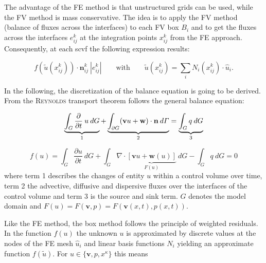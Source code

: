 The advantage of the FE method is that unstructured grids can be used, while the FV method is mass conservative. The idea is to apply the FV method (balance of fluxes across the interfaces) to each FV box $B_i$  and to get the fluxes across the interfaces $e^k_{ij}$ at the integration points $x^k_{ij}$ from the FE approach. Consequently, at each scvf the following expression results:

\begin{equation}
 	f(\tilde u(x^k_{ij})) \cdot \mathbf n^k_{ij} \: |e^k_{ij}| \qquad \textrm{with} \qquad \tilde u(x^k_{ij}) = \sum_i N_i(x^k_{ij}) \cdot \hat u_i .
\end{equation}

In the following, the discretization of the balance equation is going to be derived. From the \textsc{Reynolds} transport theorem follows the general balance equation:

\begin{equation}
	\underbrace{\int_G \frac{\partial}{\partial t} \: u \: dG}_{1} + \underbrace{\int_{\partial G} (\mathbf{v} u + \mathbf w) \cdot \textbf n \: d\varGamma}_{2} = \underbrace{\int_G q \: dG}_{3}
\end{equation}

\begin{equation}
	f(u) = \int_G \frac{\partial u}{\partial t} \: dG + \int_{G} \nabla \cdot \underbrace{\left[  \mathbf{v} u + \mathbf w(u)\right] }_{F(u)}  \: dG - \int_G q \: dG = 0
\end{equation}
where term 1 describes the changes of entity $u$ within a control volume over time, term 2 the advective, diffusive and dispersive fluxes over the interfaces of the control volume and term 3 is the source and sink term. $G$ denotes the model domain and $F(u) = F(\mathbf v, p) = F(\mathbf v(x,t), p(x,t))$.

Like the FE method, the box method follows the principle of weighted residuals. In the function $f(u)$ the unknown $u$ is approximated by discrete values at the nodes of the FE mesh $\hat u_i$ and linear basis functions $N_i$ yielding an approximate function $f(\tilde u)$. For $u\in \lbrace \mathbf v, p, x^\kappa \rbrace$ this means

